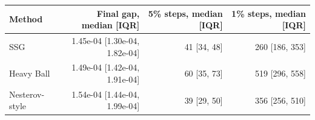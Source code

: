 \begin{tabular}{lrrr}
\toprule
Method & Final gap, median [IQR] & 5\% steps, median [IQR] & 1\% steps, median [IQR] \\
\midrule
SSG & 1.45e-04 [1.30e-04, 1.82e-04] & 41 [34, 48] & 260 [186, 353] \\
Heavy Ball & 1.49e-04 [1.42e-04, 1.91e-04] & 60 [35, 73] & 519 [296, 558] \\
Nesterov-style & 1.54e-04 [1.44e-04, 1.99e-04] & 39 [29, 50] & 356 [256, 510] \\
\bottomrule
\end{tabular}
